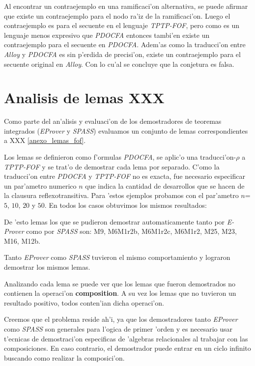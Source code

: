 Al encontrar un contraejemplo en una ramificaci'on alternativa, se puede afirmar que existe un contraejemplo para el nodo ra'iz de la ramificaci'on. Luego el contraejemplo es para el secuente en el lenguaje \textit{TPTP-FOF}, pero como es un lenguaje menos expresivo que \textit{PDOCFA} entonces tambi'en existe un contraejemplo para el secuente en \textit{PDOCFA}. Adem'as como la traducci'on entre \textit{Alloy} y \textit{PDOCFA} es sin p'erdida de precisi'on, existe un contraejemplo para el secuente original en \textit{Alloy}. Con lo cu'al se concluye que la conjetura es falsa.


\section{Analisis de lemas XXX}
\label{analisis_lemas}
Como parte del an'alisis y evaluaci'on de los demostradores de teoremas integrados (\textit{EProver} y \textit{SPASS}) evaluamos un conjunto de lemas correspondientes a XXX \ref{anexo_lemas_fof}.

Los lemas se definieron como f'ormulas \textit{PDOCFA}, se aplic'o una traducci'on-$\rho$ a \textit{TPTP-FOF} y se trat'o de demostrar cada lema por separado. C'omo la traducci'on entre \textit{PDOCFA} y \textit{TPTP-FOF} no es exacta, fue necesario especificar un par'ametro numerico $n$ que indica la cantidad de desarrollos que se hacen de la clausura reflexotransitiva. Para 'estos ejemplos probamos con el par'ametro $n$=$5$, $10$, $20$ y $50$. En todos los casos obtuvimos los mismos resultados:

\vspace{1em}

\vspace{1em}

De 'esto lemas los que se pudieron demostrar automaticamente tanto por \textit{E-Prover} como por \textit{SPASS} son: M9, M6M1r2b, M6M1r2c, M6M1r2, M25, M23, M16, M12b.

Tanto \textit{EProver} como \textit{SPASS} tuvieron el mismo comportamiento y lograron demostrar los mismos lemas.

Analizando cada lema se puede ver que los lemas que fueron demostrados no contienen la operaci'on \textbf{composition}. A su vez los lemas que no tuvieron un resultado positivo, todos conten'ian dicha operaci'on. 

Creemos que el problema reside ah'i, ya que los demostradores tanto \textit{EProver} como  \textit{SPASS} son generales para l'ogica de primer 'orden y es necesario usar t'ecnicas de demostraci'on especificas de 'algebras relacionales al trabajar con las composiciones. En caso contrario, el demostrador puede entrar en un ciclo infinito buscando como realizar la composici'on.


